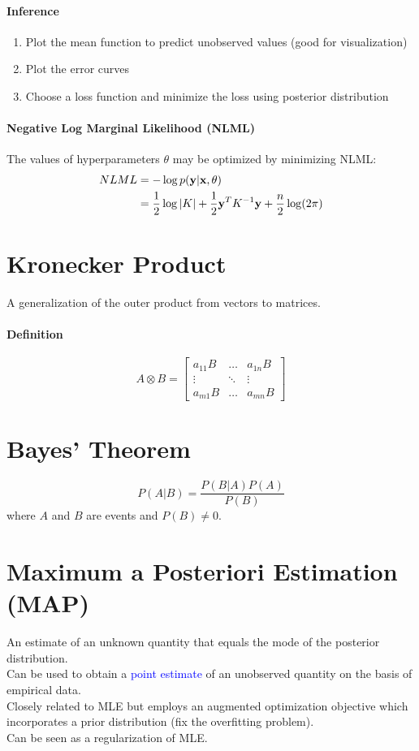 \documentclass[11pt]{article}
\begin{document}
\paragraph{Inference}
\begin{enumerate}
	\item Plot the mean function to predict unobserved values (good for visualization)
	\item Plot the error curves
	\item Choose a loss function and minimize the loss using posterior distribution
\end{enumerate}
\paragraph{Negative Log Marginal Likelihood (NLML)}
The values of hyperparameters $\theta$ may be optimized by minimizing NLML:
\begin{align*}
	NLML &= -\log p(\textbf{y}|\textbf{x},\theta) \\
	&= \frac{1}{2}\log |K| + \frac{1}{2}\textbf{y}^TK^{-1}\textbf{y} + \frac{n}{2} \log (2\pi)
\end{align*}
\section{Kronecker Product}
A generalization of the outer product from vectors to matrices.
\paragraph{Definition}
$$A \otimes B = \begin{bmatrix}
	a_{11}B & \hdots & a_{1n}B \\
	\vdots & \ddots & \vdots \\
	a_{m1}B & \hdots & a_{mn}B
\end{bmatrix}$$
\section{Bayes' Theorem}
$$P(A|B) = \frac{P(B|A)P(A)}{P(B)}$$
where $A$ and $B$ are events and $P(B) \neq 0$.
\section{Maximum a Posteriori Estimation (MAP)}
An estimate of an unknown quantity that equals the mode of the posterior distribution. \\
Can be used to obtain a \textcolor{blue}{point estimate} of an unobserved quantity on the basis of empirical data.\\
Closely related to MLE but employs an augmented optimization objective which incorporates a prior distribution (fix the overfitting problem). \\
Can be seen as a regularization of MLE.
\end{document}
